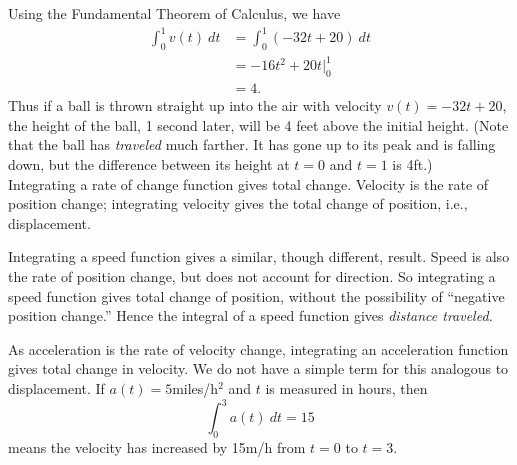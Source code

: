 {Using the Fundamental Theorem of Calculus, we have 
\begin{align*}
\int_0^1 v(t)\ dt &= \int_0^1 (-32t+20)\ dt \\
			&= -16t^2 + 20t\Big|_0^1 \\
			&= 4.
\end{align*}
Thus if a ball is thrown straight up into the air with velocity $v(t) = -32t+20$, the height of the ball, 1 second later, will be 4 feet above the initial height. (Note that the ball has \textit{traveled} much farther. It has gone up to its peak and is falling down, but the difference between its height at $t=0$ and $t=1$ is 4ft.)
}\\

Integrating a rate of change function gives total change. Velocity is the rate of position change; integrating velocity gives the total change of position, i.e., displacement.

Integrating a speed function gives a similar, though different, result. Speed is also the rate of position change, but does not account for direction. So integrating a speed function gives total change of position, without the possibility of ``negative position change.'' Hence the integral of a speed function gives \textit{distance traveled.}


As acceleration is the rate of velocity change, integrating an acceleration function gives total change in velocity. We do not have a simple term for this analogous to displacement. If $a(t) = 5$miles/h$^2$ and $t$ is measured in hours, then 
$$\int_0^3 a(t)\ dt = 15$$
means the velocity has increased by 15m/h from $t=0$ to $t=3$.
\\

